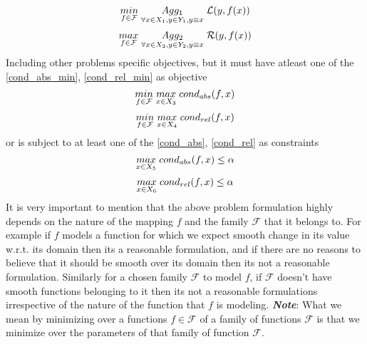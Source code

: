 \begin{equation} \label{opt_loss}
\underset{f\in \mathcal{F}}{min}\hspace{1mm} \underset{\forall x\in X_1, y \in Y_1, y \equiv x}{Agg_1} \hspace{1mm} \mathcal{L}(y,f(x))
\end{equation}
\begin{equation} \label{opt_reward}
\underset{f\in \mathcal{F}}{max}\hspace{1mm} \underset{\forall x\in X_2, y \in Y_2, y \equiv x}{Agg_2} \hspace{1mm} \mathcal{R}(y,f(x))
\end{equation}
Including other problems specific objectives, but it must have atleast one of the \ref{cond_abs_min}, \ref{cond_rel_min} as objective
\begin{equation} \label{cond_abs_min}
\underset{f\in \mathcal{F}}{min}\hspace{1mm}\underset{x \in X_3}{max}\hspace{1mm} cond_{abs}(f,x)
\end{equation}
\begin{equation} \label{cond_rel_min}
\underset{f\in \mathcal{F}}{min}\hspace{1mm} \underset{x \in X_4}{max}\hspace{1mm}cond_{rel}(f,x)
\end{equation}
or is subject to at least one of the \ref{cond_abs}, \ref{cond_rel} as constraints
\begin{equation} \label{cond_abs}
\underset{x \in X_5}{max}\hspace{1mm}cond_{abs}(f,x) \le \alpha 
\end{equation}
\begin{equation} \label{cond_rel}
\underset{x \in X_6}{max}\hspace{1mm} cond_{rel}(f,x) \le \alpha 
\end{equation}
\newline It is very important to mention that the above problem formulation highly depends on the nature of the mapping $f$ and the family $\mathcal{F}$ that it belongs to. For example if $f$ models a function for which we expect smooth change in its value w.r.t. its domain then its a reasonable formulation, and if there are no reasons to believe that it should be smooth over its domain then its not a reasonable formulation. Similarly for a chosen family $\mathcal{F}$ to model $f$, if $\mathcal{F}$ doesn't have smooth functions belonging to it then its not a reasonable formulations irrespective of the nature of the function that $f$ is modeling.
\newline\newline
\textbf{\textit{Note}}: What we mean by minimizing over a functions $f \in \mathcal{F}$ of a family of functions $\mathcal{F}$ is that we minimize over the parameters of that family of function $\mathcal{F}$.

